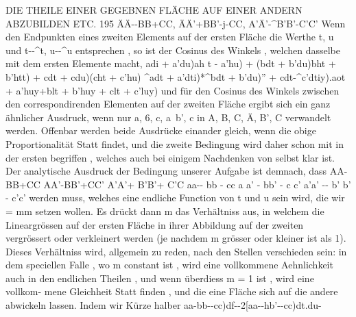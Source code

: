 \documentclass[12pt,a4paper]{article}
\begin{document}
{{{{{{{{DIE THEILE EINER GEGEBNEN FLÄCHE AUF EINER ANDERN ABZUBILDEN ETC. 195
ÄÄ-{-BB+CC, ÄÄ'+BB'-j-CC, A'Ä'-^B'B'-\-C'C'
Wenn den Endpunkten eines zweiten Elements auf der ersten Fläche die Werthe
t, u und t-{-^t, u-{-^u
entsprechen , so ist der Cosinus des Winkels , welchen dasselbe mit dem ersten
Elemente macht,
{adi + a'du){ah t -\- a'hu) + (bdt + b'du){bht + b'htt) + {cdt + cdu)(cht + c'hu)
^{{adt + a'dti)*^{bdt + b'du)'' + {cdt-^c'dtiy).{{aot + a'huy+{blt + b'huy + {clt + c'luy)
und für den Cosinus des Winkels zwischen den correspondirenden Elementen
auf der zweiten Fläche ergibt sich ein ganz ähnlicher Ausdruck, wenn nur
a, 6, c, a\ b', c in A, B, C, Ä, B', C verwandelt werden. Offenbar werden beide
Ausdrücke einander gleich, wenn die obige Proportionalität Statt findet, und die
zweite Bedingung wird daher schon mit in der ersten begriffen , welches auch bei
einigem Nachdenken von selbst klar ist.
Der analytische Ausdruck der Bedingung unserer Aufgabe ist demnach, dass
AA-\-BB+CC AA'-\-BB'+CC' A'A'+ B'B'+ C'C
aa-{- bb -\- cc a a' -\- bb' -\- c c' a'a' -{- b' b' -\- c'c'
werden muss, welches eine endliche Function von t und u sein wird, die wir
= mm setzen wollen. Es drückt dann m das Verhältniss aus, in welchem die
Lineargrössen auf der ersten Fläche in ihrer Abbildung auf der zweiten vergrössert
oder verkleinert werden (je nachdem m grösser oder kleiner ist als 1). Dieses
Verhältniss wird, allgemein zu reden, nach den Stellen verschieden sein: in dem
speciellen Falle , wo m constant ist , wird eine vollkommene Aehnlichkeit auch
in den endlichen Theilen , und wenn überdiess m = 1 ist , wird eine vollkom-
mene Gleichheit Statt finden , und die eine Fläche sich auf die andere abwickeln
lassen.
Indem wir Kürze halber
{aa-\-bb-{-cc)df-{-2[aa-{-hb'-{-cc)dt.du-\-{aa-{-b'b'-^cc)du~ = w
setzen , b emerken wir , dass die Differentialgleichung w = 0 zwei Integrationen
zulassen wird. Indem man nemlich das Trinomium w in zwei, in Beziehung auf

dt und du lineare, Factoren zerlegt, miiss entweder der eine oder der andere
Factor = 0 werden, welches zwei verschiedene Integrationen geben wird. Die
eine Integration wird der Gleichung
0 = (^aa-\-bb-\-cc)dt
-\- {a a-\- h h'-{- c c'-\- i \l([a a-{-bh-{-cc) [dd-\- yh'-\- c'c ) — [a d-{- b b'-}- ccf)\du
entsprechen (wo i Kürze halber für \J— l geschrieben ist, indem man sich leicht
überzeugt , dass der irrationale Theil des Ausdrucks imaginär werden muss) ; die
andere einer ganz ähnlichen Gleichung, wenn nur i mit — i vertauscht wird.
Ist also das Integral der erstem Gleichung dieses :
p-\-iq = Const.
wo p und q reelle Functionen von t und w bedeuten, so wird das andere Integral
p — iq = Const.
und die Natur der Sache wird es mit sich bringen , dass
{dp-{-idq) .{dp — idq) oder dp^-\-dq^
ein Factor von to , oder
u) = n(dp^-\-dq^)
werden muss, wo n eine endliche Function von t und u sein wird.
Wir wollen nun das Trinomium, in welches
dX^ + dF=^+dZ'-
übergeht, wenn für dX, dF, dZ ihre Werthe durch T, U, dT, dU substituirt
werden, durch Q bezeichnen, und annehmen, dass auf ähnliche Weise, wie vor-
her ,d ie beiden Integrale der Gleichung Q = 0 diese seien : r
P-{-iQ = Const.
P — iQ = Const.
und
Q = iV(dP^+dQ2)
wo P, Q, N reelle Functionen von T und U bedeuten werden.

}}}}}}}}}}}}}}}}}}}}}}}}}}}}}}}}}}}}}}}}
\end{document}
